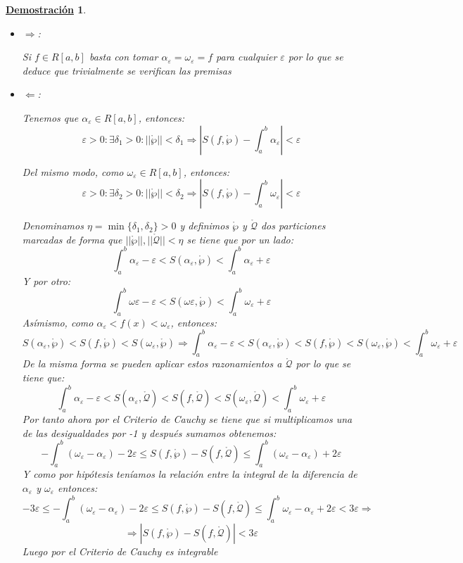\documentclass[10pt,a4paper,openright]{book}
\theoremstyle{break}
\newtheorem*{demo}{\underline{Demostración}}
\begin{document}
\begin{demo}
\begin{itemize}
\item $\Rightarrow $:

Si $f\in R[a,b]$ basta con tomar $\alpha_\varepsilon = \omega_\varepsilon = f$ para cualquier $\varepsilon$ por lo que se deduce que trivialmente se verifican las premisas

\item $\Leftarrow$:

Tenemos que $\alpha_\varepsilon\in R[a,b]$, entonces:
$$\varepsilon > 0 :\exists \delta_1 >0: ||\mathring{\wp}||<\delta_1\Rightarrow \left|S(f,\mathring{\wp})-\int_{a}^{b}\alpha_\varepsilon \right|<\varepsilon$$

Del mismo modo, como $\omega_\varepsilon\in R[a,b]$, entonces:
$$\varepsilon >0: \exists \delta_2>0 : ||\mathring{\wp}||<\delta_2\Rightarrow \left|S(f,\mathring{\wp})- \int_{a}^{b}\omega_\varepsilon \right| <\varepsilon$$

Denominamos $\eta = \min\{\delta_1, \delta_2\} >0$ y definimos $\mathring{\wp}$ y $\mathring{\mathcal{Q}}$ dos particiones marcadas de forma que $||\mathring{\wp}||,||\mathring{\mathcal{Q}}||<\eta$ se tiene que por un lado:
$$\int_{a}^{b}\alpha_\varepsilon -\varepsilon < S(\alpha_\varepsilon, \mathring{\wp}) < \int_{a}^{b}\alpha_\varepsilon + \varepsilon$$
Y por otro:
$$\int_{a}^{b}\omega\varepsilon -\varepsilon < S(\omega\varepsilon, \mathring{\wp}) < \int_{a}^{b}\omega_\varepsilon + \varepsilon$$
Asímismo, como $\alpha_\varepsilon < f(x)< \omega_\varepsilon$, entonces:
$$S(\alpha_\varepsilon, \mathring{\wp}) < S(f,\mathring{\wp}) < S(\omega_\varepsilon, \mathring{\wp})\Rightarrow \int_{a}^{b}\alpha_\varepsilon - \varepsilon < S(\alpha_\varepsilon, \mathring{\wp}) < S(f,\mathring{\wp}) < S(\omega_\varepsilon, \mathring{\wp}) < \int_{a}^{b}\omega_\varepsilon + \varepsilon$$
De la misma forma se pueden aplicar estos razonamientos a $\mathring{\mathcal{Q}}$ por lo que se tiene que:
$$\int_{a}^{b}\alpha_\varepsilon - \varepsilon < S(\alpha_\varepsilon, \mathring{\mathcal{Q}}) < S(f,\mathring{\mathcal{Q}}) < S(\omega_\varepsilon, \mathring{\mathcal{Q}}) < \int_{a}^{b}\omega_\varepsilon + \varepsilon$$
Por tanto ahora por el Criterio de Cauchy se tiene que si multiplicamos una de las desigualdades por -1 y después sumamos obtenemos:
$$-\int_{a}^{b}(\omega_\varepsilon - \alpha_\varepsilon)-2\varepsilon \leq S(f,\mathring{\wp})- S(f,\mathring{\mathcal{Q}})\leq \int_{a}^{b}(\omega_\varepsilon - \alpha_\varepsilon) + 2\varepsilon$$
Y como por hipótesis teníamos la relación entre la integral de la diferencia de $\alpha_\varepsilon$ y $\omega_\varepsilon$ entonces:
$$-3 \varepsilon\leq -\int_{a}^{b}(\omega_\varepsilon - \alpha_\varepsilon)-2\varepsilon \leq S(f,\mathring{\wp})- S(f,\mathring{\mathcal{Q}})\leq \int_{a}^{b}\omega_\varepsilon - \alpha_\varepsilon + 2\varepsilon < 3\varepsilon\Rightarrow$$
$$\Rightarrow \left|S(f,\mathring{\wp})- S(f,\mathring{\mathcal{Q}})\right| < 3\varepsilon$$
Luego por el Criterio de Cauchy es integrable
\end{itemize}
\end{demo}
\end{document}
